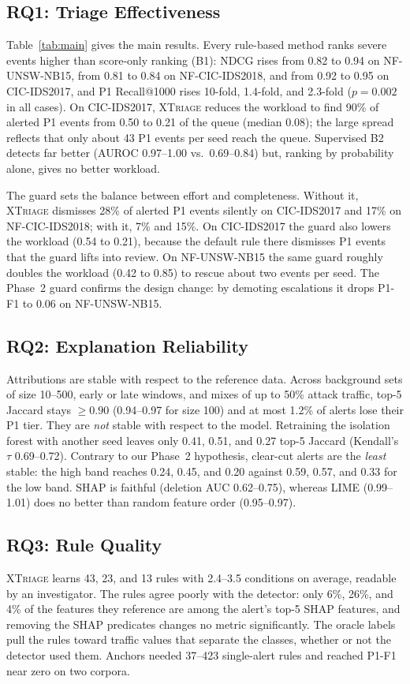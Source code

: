 \documentclass[journal]{IEEEtran}
\begin{document}
\subsection{RQ1: Triage Effectiveness}
Table~\ref{tab:main} gives the main results. Every rule-based method ranks severe events higher than score-only ranking (B1): NDCG rises from 0.82 to 0.94 on NF-UNSW-NB15, from 0.81 to 0.84 on NF-CIC-IDS2018, and from 0.92 to 0.95 on CIC-IDS2017, and P1 Recall@1000 rises 10-fold, 1.4-fold, and 2.3-fold ($p=0.002$ in all cases). On CIC-IDS2017, \textsc{XTriage} reduces the workload to find 90\% of alerted P1 events from 0.50 to 0.21 of the queue (median 0.08); the large spread reflects that only about 43 P1 events per seed reach the queue. Supervised B2 detects far better (AUROC 0.97--1.00 vs.\ 0.69--0.84) but, ranking by probability alone, gives no better workload.

The guard sets the balance between effort and completeness. Without it, \textsc{XTriage} dismisses 28\% of alerted P1 events silently on CIC-IDS2017 and 17\% on NF-CIC-IDS2018; with it, 7\% and 15\%. On CIC-IDS2017 the guard also lowers the workload (0.54 to 0.21), because the default rule there dismisses P1 events that the guard lifts into review. On NF-UNSW-NB15 the same guard roughly doubles the workload (0.42 to 0.85) to rescue about two events per seed. The Phase~2 guard confirms the design change: by demoting escalations it drops P1-F1 to 0.06 on NF-UNSW-NB15.

\subsection{RQ2: Explanation Reliability}
Attributions are stable with respect to the reference data. Across background sets of size 10--500, early or late windows, and mixes of up to 50\% attack traffic, top-5 Jaccard stays $\geq 0.90$ (0.94--0.97 for size 100) and at most 1.2\% of alerts lose their P1 tier. They are \emph{not} stable with respect to the model. Retraining the isolation forest with another seed leaves only 0.41, 0.51, and 0.27 top-5 Jaccard (Kendall's $\tau$ 0.69--0.72). Contrary to our Phase~2 hypothesis, clear-cut alerts are the \emph{least} stable: the high band reaches 0.24, 0.45, and 0.20 against 0.59, 0.57, and 0.33 for the low band. SHAP is faithful (deletion AUC 0.62--0.75), whereas LIME (0.99--1.01) does no better than random feature order (0.95--0.97).

\subsection{RQ3: Rule Quality}
\textsc{XTriage} learns 43, 23, and 13 rules with 2.4--3.5 conditions on average, readable by an investigator. The rules agree poorly with the detector: only 6\%, 26\%, and 4\% of the features they reference are among the alert's top-5 SHAP features, and removing the SHAP predicates changes no metric significantly. The oracle labels pull the rules toward traffic values that separate the classes, whether or not the detector used them. Anchors needed 37--423 single-alert rules and reached P1-F1 near zero on two corpora.
\end{document}
